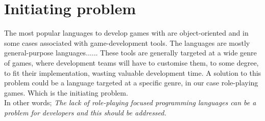 \section{Initiating problem}
The most popular languages to develop games with are object-oriented and in some cases associated with game-development tools.
The languages are mostly general-purpose languages......
These tools are generally targeted at a wide genre of games, where development teams will have to customise them, to some degree, to fit their implementation, wasting valuable development time.
A solution to this problem could be a language targeted at a specific genre, in our case role-playing games.
Which is the initiating problem.\\
In other words; \emph{The lack of role-playing focused programming languages can be a problem for developers and this should be addressed.}






